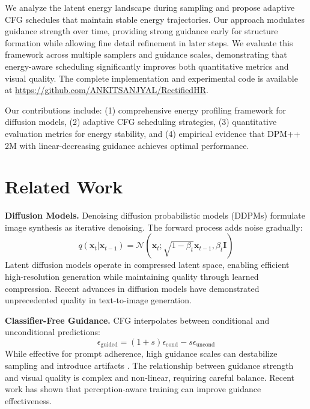 \documentclass[10pt,twocolumn]{article}
\begin{document}
We analyze the latent energy landscape during sampling and propose adaptive CFG schedules that maintain stable energy trajectories. Our approach modulates guidance strength over time, providing strong guidance early for structure formation while allowing fine detail refinement in later steps. We evaluate this framework across multiple samplers and guidance scales, demonstrating that energy-aware scheduling significantly improves both quantitative metrics and visual quality. The complete implementation and experimental code is available at \url{https://github.com/ANKITSANJYAL/RectifiedHR}.

Our contributions include: (1) comprehensive energy profiling framework for diffusion models, (2) adaptive CFG scheduling strategies, (3) quantitative evaluation metrics for energy stability, and (4) empirical evidence that DPM++ 2M with linear-decreasing guidance achieves optimal performance.

\section{Related Work}
\textbf{Diffusion Models.} Denoising diffusion probabilistic models (DDPMs) \cite{ho2020denoising,song2020score,nichol2021improved} formulate image synthesis as iterative denoising. The forward process adds noise gradually:
\begin{equation}
q(\mathbf{x}_t|\mathbf{x}_{t-1}) = \mathcal{N}(\mathbf{x}_t; \sqrt{1-\beta_t}\mathbf{x}_{t-1}, \beta_t \mathbf{I})
\end{equation}
Latent diffusion models \cite{rombach2022high,esser2021taming} operate in compressed latent space, enabling efficient high-resolution generation while maintaining quality through learned compression. Recent advances in diffusion models \cite{dhariwal2021diffusion,ramesh2022hierarchical} have demonstrated unprecedented quality in text-to-image generation.

\textbf{Classifier-Free Guidance.} CFG \cite{ho2022classifier,avrahami2022blended} interpolates between conditional and unconditional predictions:
\begin{equation}
\epsilon_{\text{guided}} = (1 + s)\epsilon_{\text{cond}} - s\epsilon_{\text{uncond}}
\end{equation}
While effective for prompt adherence, high guidance scales can destabilize sampling and introduce artifacts \cite{gal2022image,patashnik2021styleclip}. The relationship between guidance strength and visual quality is complex and non-linear, requiring careful balance. Recent work \cite{choi2022perception} has shown that perception-aware training can improve guidance effectiveness.
\end{document}
